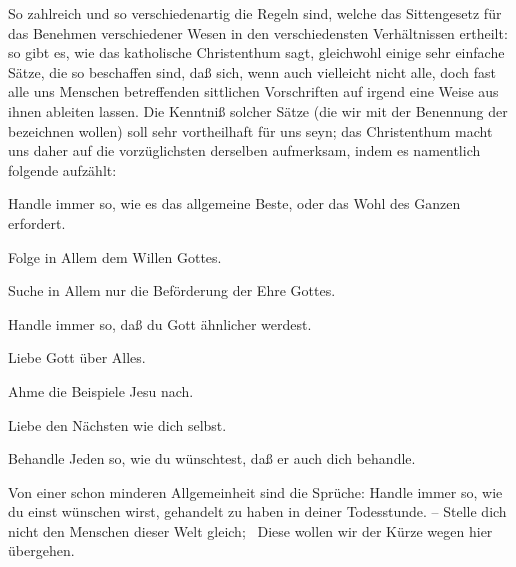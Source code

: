 So zahlreich und so verschiedenartig die Regeln sind, welche das Sittengesetz für das Benehmen verschiedener Wesen in den verschiedensten Verhältnissen ertheilt: so gibt es, wie das katholische Christenthum sagt, gleichwohl einige sehr einfache Sätze, die so beschaffen sind, daß sich, wenn auch vielleicht nicht alle, doch fast alle uns Menschen betreffenden sittlichen Vorschriften auf irgend eine Weise aus ihnen ableiten lassen. Die Kenntniß solcher Sätze (die wir mit der Benennung der  bezeichnen wollen) soll sehr vortheilhaft für uns seyn; das Christenthum macht uns daher auf die vorzüglichsten derselben aufmerksam, indem es namentlich folgende aufzählt:
\begin{aufza}
\item Handle immer so, wie es das allgemeine Beste, oder das Wohl des Ganzen erfordert.~
\item Folge in Allem dem Willen Gottes.
\item Suche in Allem nur die Beförderung der Ehre Gottes.
\item Handle immer so, daß du Gott ähnlicher werdest.
\item Liebe Gott über Alles.
\item Ahme die Beispiele Jesu nach.
\item Liebe den Nächsten wie dich selbst.
\item Behandle Jeden so, wie du wünschtest, daß er auch dich behandle.
\end{aufza}
\begin{RWanm} Von einer schon minderen Allgemeinheit sind die Sprüche: Handle immer so, wie du einst wünschen wirst, gehandelt zu haben in deiner Todesstunde. -- Stelle dich nicht den Menschen dieser Welt gleich; \usw\ Diese wollen wir der Kürze wegen hier übergehen. 
\end{RWanm}

